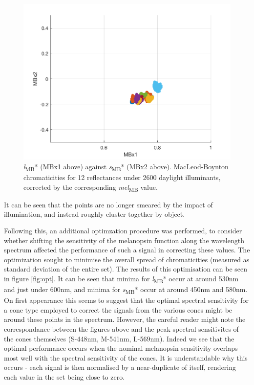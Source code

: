 \documentclass{article}
\begin{document}
\begin{figure}[ht]
    \centering
    \includegraphics{figs/corrected.pdf}
    \caption{\textit{l}\textsubscript{MB}* (MBx1 above) against \textit{s}\textsubscript{MB}* (MBx2 above). MacLeod-Boynton chromaticities for 12 reflectances under 2600 daylight illuminants, corrected by the corresponding \textit{mel}\textsubscript{MB} value.}
    \label{fig:corrected}
\end{figure} 

It can be seen that the points are no longer smeared by the impact of illumination, and instead roughly cluster together by object.

Following this, an additional optimzation procedure was performed, to consider whether shifting the sensitivity of the melanopsin function along the wavelength spectrum affected the performance of such a signal in correcting these values. The optimization sought to minimise the overall spread of chromaticities (measured as standard deviation of the entire set). The results of this optimisation can be seen in figure \ref{fig:opt}. It can be seen that minima for \textit{l}\textsubscript{MB}* occur at around 530nm and just under 600nm, and minima for \textit{s}\textsubscript{MB}* occur at around 450nm and 580nm. On first appearance this seems to suggest that the optimal spectral sensitivity for a cone type employed to correct the signals from the various cones might be around these points in the spectrum. However, the careful reader might note the correspondance between the figures above and the peak spectral sensitivites of the cones themselves (S-448nm, M-541nm, L-569nm). Indeed we see that the optimal performance occurs when the nominal melanopsin sensitivity overlaps most well with the spectral sensitivity of the cones. It is understandable why this occurs - each signal is then normalised by a near-duplicate of itself, rendering each value in the set being close to zero.
\end{document}
